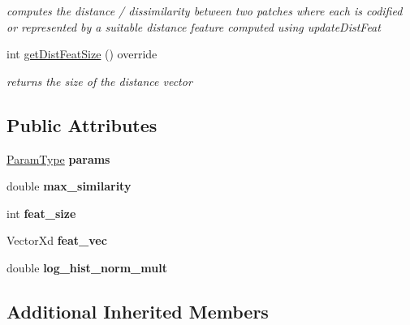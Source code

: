 \begin{DoxyCompactItemize}
\begin{DoxyCompactList}\small\item\em computes the distance / dissimilarity between two patches where each is codified or represented by a suitable distance feature computed using update\-Dist\-Feat \end{DoxyCompactList}\item 
\hypertarget{classMI_a82b2a4d72d131baf6de5283815a246c1}{int \hyperlink{classMI_a82b2a4d72d131baf6de5283815a246c1}{get\-Dist\-Feat\-Size} () override}\label{classMI_a82b2a4d72d131baf6de5283815a246c1}

\begin{DoxyCompactList}\small\item\em returns the size of the distance vector \end{DoxyCompactList}\end{DoxyCompactItemize}
\subsection*{Public Attributes}
\begin{DoxyCompactItemize}
\item 
\hypertarget{classMI_a4d91283e023334a25673a1c0beba70a6}{\hyperlink{structMIParams}{Param\-Type} {\bfseries params}}\label{classMI_a4d91283e023334a25673a1c0beba70a6}

\item 
\hypertarget{classMI_a5afdb949da95c4a2ed5d6b59309cf5c7}{double {\bfseries max\-\_\-similarity}}\label{classMI_a5afdb949da95c4a2ed5d6b59309cf5c7}

\item 
\hypertarget{classMI_ab7dbf2b195e7b798e3b545befb8e0d3c}{int {\bfseries feat\-\_\-size}}\label{classMI_ab7dbf2b195e7b798e3b545befb8e0d3c}

\item 
\hypertarget{classMI_a1cc095fbe2b061decada4969a2f31d2c}{Vector\-Xd {\bfseries feat\-\_\-vec}}\label{classMI_a1cc095fbe2b061decada4969a2f31d2c}

\item 
\hypertarget{classMI_a205ca492e34e6d1c2e90ba10142dcb64}{double {\bfseries log\-\_\-hist\-\_\-norm\-\_\-mult}}\label{classMI_a205ca492e34e6d1c2e90ba10142dcb64}

\end{DoxyCompactItemize}
\subsection*{Additional Inherited Members}


